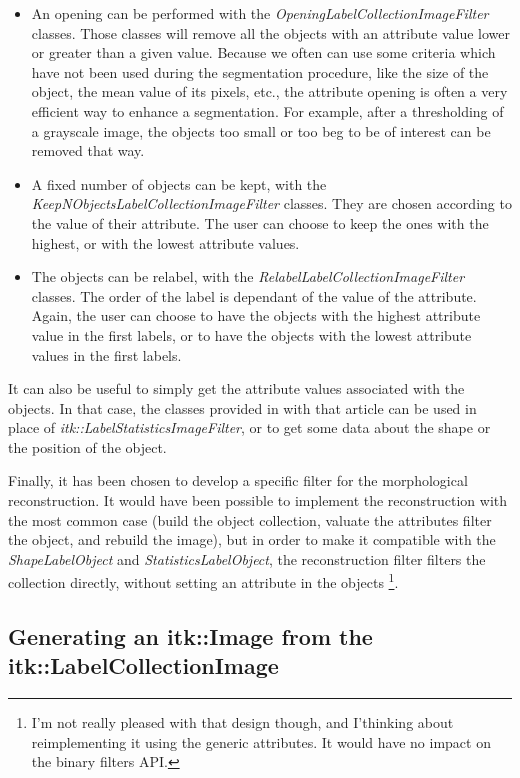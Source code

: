 \documentclass{InsightArticle}
\begin{document}
\begin{itemize}
  \item An opening can be performed with the {\em
OpeningLabelCollectionImageFilter} classes. Those classes will remove all the
objects with an attribute value lower or greater than a given value.
Because we often can use some criteria  which have not been used during the segmentation
procedure, like the size of the object, the mean value of its pixels, etc., the attribute
opening is often a very efficient way to enhance a segmentation. For example, after
a thresholding of a grayscale image, the objects too small or too beg to be of interest
can be removed that way.

  \item A fixed number of objects can be kept, with the {\em
KeepNObjectsLabelCollectionImageFilter} classes. They are chosen according to
the value of their attribute. The user can choose to keep the ones with the
highest, or with the lowest attribute values.

  \item The objects can be relabel, with the {\em
RelabelLabelCollectionImageFilter} classes. The order of the label is dependant
of the value of the attribute. Again, the user can choose to have the objects
with the highest attribute value in the first labels, or to have the objects
with the lowest attribute values in the first labels.
\end{itemize}

It can also be useful to simply get the attribute values associated with the
objects. In that case, the classes provided in with that article can be used in
place of {\em itk::LabelStatisticsImageFilter}, or to get some data about the
shape or the position of the object.

Finally, it has been chosen to develop a specific filter for the morphological
reconstruction. It would have been possible to implement the reconstruction
with the most common case (build the object collection, valuate the attributes
filter the object, and rebuild the image), but in order to make it compatible
with the {\em ShapeLabelObject} and {\em StatisticsLabelObject}, the reconstruction
filter filters the collection directly, without setting an attribute in the objects
\footnote{I'm not really pleased with that design though, and I'thinking about
reimplementing it using the generic attributes. It would have no impact on the
binary filters API.}.

\subsection{Generating an itk::Image from the itk::LabelCollectionImage}
\end{document}
